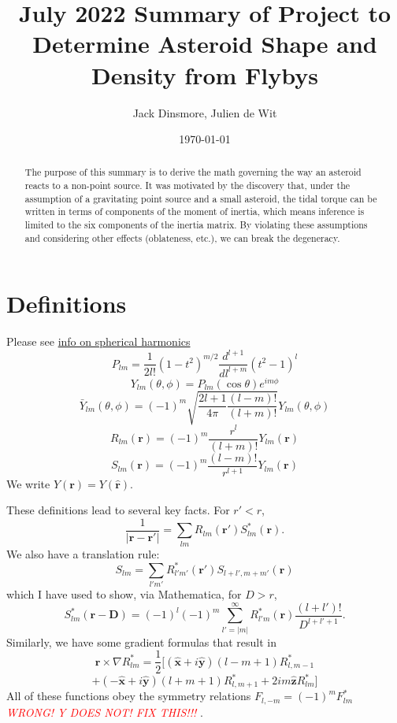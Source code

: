 \documentclass[aps,twocolumn,secnumarabic,balancelastpage,amsmath,amssymb,nofootinbib,floatfix]{revtex4-1}
\begin{document}
\title{July 2022 Summary of Project to Determine Asteroid Shape and Density from Flybys}
\author{Jack Dinsmore, Julien de Wit}
\date{\today}

\newcommand{\abs}[1]{\left| #1 \right|}
\newcommand{\parens}[1]{\left( #1 \right)}
\newcommand{\brackets}[1]{\left[ #1 \right]}
\newcommand{\comment}[1]{\textcolor{red}{\emph{ #1 }}}
\newcommand{\x}{\bm{\hat x}}
\newcommand{\y}{\bm{\hat y}}
\newcommand{\z}{\bm{\hat z}}
\newcommand{\J}{\mathcal{J}}
\newcommand{\M}{\mathcal{M}}
\newcommand{\R}{\mathcal{R}}





\begin{abstract}
    The purpose of this summary is to derive the math governing the way an asteroid reacts to a non-point source. It was motivated by the discovery that, under the assumption of a gravitating point source and a small asteroid, the tidal torque can be written in terms of components of the moment of inertia, which means inference is limited to the six components of the inertia matrix. By violating these assumptions and considering other effects (oblateness, etc.), we can break the degeneracy.
\end{abstract}

\maketitle



\section{Definitions}
Please see \href{https://citeseerx.ist.psu.edu/viewdoc/download?doi=10.1.1.56.5257&rep=rep1&type=pdf}{info on spherical harmonics}
$$P_{lm}=\frac{1}{2l!}(1-t^2)^{m/2} \frac{d^{l+1}}{dl^{l+m}}(t^2-1)^l$$
$$Y_{lm}(\theta, \phi) = P_{lm}(\cos\theta)e^{im\phi}$$
$$\bar Y_{lm}(\theta, \phi) = (-1)^m \sqrt{\frac{2l+1}{4\pi}\frac{(l-m)!}{(l+m)!}} Y_{lm}(\theta, \phi)$$
$$R_{lm}(\bm r) = (-1)^m \frac{r^l}{(l+m)!}Y_{lm}(\bm r)$$
$$S_{lm}(\bm r) = (-1)^m \frac{(l-m)!}{r^{l+1}}Y_{lm}(\bm r)$$
We write $Y(\bm r)=Y(\hat{\bm r})$.

These definitions lead to several key facts. For $r' < r$,
$$\frac{1}{|\bm r - \bm r'|}=\sum_{lm}R_{lm}(\bm r')S^*_{lm}(\bm r).$$
We also have a translation rule:
$$S_{lm}=\sum_{l'm'}R^*_{l'm'}(\bm r')S_{l+l',m+m'}(\bm r)$$
which I have used to show, via Mathematica, for $D > r$,
$$S_{lm}^*(\bm r - \bm D)=(-1)^l (-1)^m \sum_{l'=|m|}^\infty R_{l'm}^*(\bm r) \frac{(l+l')!}{D^{l+l'+1}}.$$
Similarly, we have some gradient formulas that result in
$$\bm r \times \nabla R_{lm}^*=\frac{1}{2}[(\x + i\y)(l-m+1)R^*_{l,m-1}$$
$$+(-\x+i\y)(l+m+1)R^*_{l,m+1}+2im\z R^*_{lm}]$$
All of these functions obey the symmetry relations $F_{l,-m}=(-1)^mF_{lm}^*$
\comment{WRONG! Y DOES NOT! FIX THIS!!!}.
\end{document}
